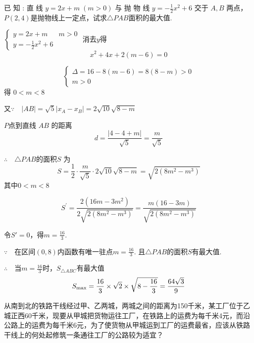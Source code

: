 \begin{example}
已 知 : 直 线 $y= 2x+ m\; ( m> 0)$ 与 抛 物 线 $y= - \frac 12x^{2} +6$ 交于 $A,B$ 两点， $P(2,4)$是抛物线上一定点，试求$\triangle PAB$面积的最大值.
\end{example}

\begin{solution}
$\begin{cases}
    y=2x+m& m>0\\
    y=-\frac{1}{2}x^{2}+6
\end{cases}$ 
消去$y$得
$$x^2+4x+2(m-6)=0$$

\[\begin{cases}
    \Delta =16-8(m-6)=8(8-m)>0\\
    m>0
\end{cases}\]
得  $0<m<8$

又$\because\quad | AB| = \sqrt {5}\left | x_{A}- x_{B}\right |=2\sqrt{10}\sqrt{8-m}$

$P$点到直线 $AB$ 的距离
$$d=\frac{|4-4+m|}{\sqrt{5}}=\frac{m}{\sqrt{5}}$$

$\therefore\quad \triangle PAB$的面积$S$ 为
$$S=\frac{1}{2}\cdot\frac{m}{\sqrt{5}}\cdot2\sqrt{10}\sqrt{8-m}=\sqrt{2(8m^{2}-m^{3})}$$
其中$0<m<8$

$$S^{\prime}=\frac{2(16m-3m^{2})}{2\sqrt{2(8m^{2}-m^{3})}}=\frac{m(16-3m)}{\sqrt{2(8m^{2}-m^{3})}}$$

    令$S'=0$，得$m=\frac{16}{3}$.

$\because\quad $在区间$(0,8)$内函数有唯一驻点$m=\frac{16}{3}$. 且$\triangle PAB$的面积$S$有最大值.

$\therefore\quad $当$m=\frac{16}{3}$时，$S_{\triangle ABC}$有最大值
\[S_{\max}= \dfrac{16}{3}\times \sqrt{2}\times\sqrt{8-\dfrac{16}{3}}=\dfrac{64\sqrt{3}}{9} \]
\end{solution}

\begin{example}
    从南到北的铁路干线经过甲、乙两城，两城之间的距离为150千米，某工厂位于乙城正西60千米，现要从甲城把货物运往工厂，在铁路上的运费为每千米4元，而沿公路上的运费为每千米6元，为了使货物从甲城运到工厂的运费最省，应该从铁路干线上的何处起修筑一条通往工厂的公路较为适宜？
\end{example}

